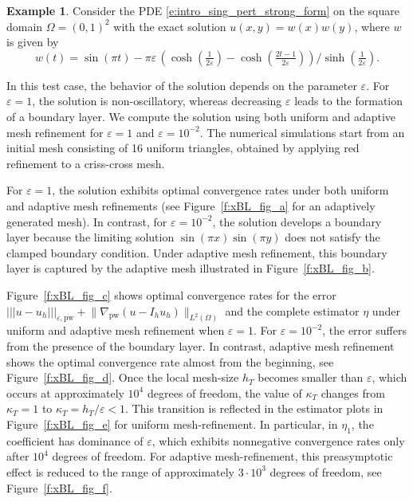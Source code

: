 \documentclass[a4paper]{amsart}
\theoremstyle{definition}
\newtheorem{example}[theorem]{Example}
\numberwithin{equation}{section}
\numberwithin{theorem}{section}
\newcommand{\pw}{\mathrm{pw}}
\newcommand{\ennorm}[1]{\lvert\!\lvert\!\lvert #1 \rvert\!\rvert\!\rvert}
\begin{document}
\begin{example}\label{eg_xBL}
Consider the PDE \eqref{e:intro_sing_pert_strong_form}
on the square domain
$\Omega=(0,1)^2$ with the exact solution
$u(x,y)=w(x)w(y)$, where $w$ is given \cite[Section 5.3]{GallistlTian2024} by
\[
w(t) = 
    \sin(\pi t) 
    - \pi \varepsilon\,
      \left(\cosh\left(\tfrac{1}{2\varepsilon}\right)
            - \cosh\left(\tfrac{2t-1}{2\varepsilon}\right)\right)
           /{\sinh\left(\tfrac{1}{2\varepsilon}\right)}
           .
\]
\end{example}
In this test case, the behavior of the solution depends on the parameter $\varepsilon$. 
For $\varepsilon = 1$, the solution is non-oscillatory, whereas decreasing $\varepsilon$ leads to the formation of a boundary layer. 
We compute the solution using both uniform and adaptive mesh refinement for $\varepsilon = 1$ and $\varepsilon = 10^{-2}$. 
The numerical simulations start from an initial mesh consisting of 16 uniform triangles, obtained by applying red refinement to a criss-cross mesh.

For  $\varepsilon = 1$, the solution exhibits optimal
convergence rates under both uniform and adaptive mesh refinements
(see Figure~\ref{f:xBL_fig_a} for an adaptively generated mesh).
In contrast, for $\varepsilon=10^{-2}$, the solution develops a boundary layer because the limiting solution $\sin(\pi x)\sin(\pi y)$ does not satisfy the clamped boundary condition. 
Under adaptive mesh refinement, this boundary layer is
captured by the adaptive mesh illustrated in Figure~\ref{f:xBL_fig_b}.

Figure~\ref{f:xBL_fig_c} shows optimal convergence rates for
the error $\ennorm{u-u_h}_{\varepsilon,\pw}
+\lVert \nabla_\pw(u-I_h u_h)\rVert_{L^2(\Omega)}$
and the complete estimator $\eta$ under uniform and adaptive
mesh refinement when $\varepsilon = 1$.
For $\varepsilon = 10^{-2}$, the error suffers from
the presence of the boundary layer.
In contrast, adaptive mesh refinement shows the optimal
convergence rate almost from the beginning, see Figure~\ref{f:xBL_fig_d}.
Once the local mesh-size $h_T$ becomes smaller than
$\varepsilon$, which occurs at approximately $10^4$ degrees of freedom,
the value of $\kappa_T$ changes from $\kappa_T=1$ to
$\kappa_T=h_T/\varepsilon < 1$.
This transition is reflected in the estimator
plots in Figure~\ref{f:xBL_fig_e} for uniform mesh-refinement.
In particular, in $\eta_1$, the coefficient has dominance of
$\varepsilon$, which exhibits nonnegative convergence rates
only after $10^4$ degrees of freedom.
For adaptive mesh-refinement, this preasymptotic effect is reduced
to the range of approximately $3\cdot 10^3$ degrees of freedom,
see Figure~\ref{f:xBL_fig_f}.
\end{document}
